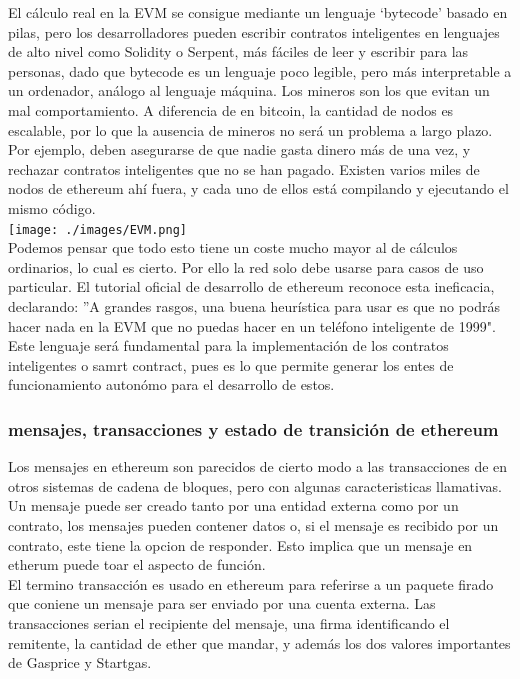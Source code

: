 \documentclass[11pt,a4paper]{article}
\begin{document}
El cálculo real en la EVM se consigue mediante un lenguaje ‘bytecode’ basado en pilas, pero los desarrolladores pueden escribir contratos inteligentes en lenguajes de alto nivel como Solidity o Serpent, más fáciles de leer y escribir para las personas, dado que bytecode es un lenguaje poco legible, pero más interpretable a un ordenador, análogo al lenguaje máquina. Los mineros son los que evitan un mal comportamiento. A diferencia de en bitcoin, la cantidad de nodos es escalable, por lo que la ausencia de mineros no será un problema a largo plazo. Por ejemplo, deben asegurarse de que
nadie gasta dinero más de una vez, y rechazar contratos inteligentes que no se han pagado. Existen varios miles de nodos de ethereum ahí fuera, y cada uno de ellos está compilando y ejecutando el mismo código.\\


\texttt{[image: ./images/EVM.png]}\\

Podemos pensar que todo esto tiene un coste mucho mayor al de cálculos ordinarios, lo cual es cierto. Por ello la red solo debe usarse para casos de uso particular. El tutorial oficial de desarrollo de ethereum reconoce esta ineficacia, declarando:
''A grandes rasgos, una buena heurística para usar es que no podrás hacer nada en la EVM que no puedas hacer en un teléfono inteligente de 1999".\\

Este lenguaje será fundamental para la implementación de los contratos inteligentes o samrt contract, pues es lo que permite generar los entes de funcionamiento autonómo para el desarrollo de estos.

\subsubsection{mensajes, transacciones y estado de transición de ethereum}

Los mensajes en ethereum son parecidos de cierto modo a las transacciones de en otros  sistemas de cadena de bloques, pero  con algunas caracteristicas llamativas. Un mensaje puede ser creado tanto por una entidad externa como por un contrato, los mensajes pueden contener datos o, si el mensaje es recibido por un contrato, este tiene la opcion de responder. Esto implica que un mensaje en etherum puede toar el aspecto de función.\\

El termino transacción es usado en  ethereum para referirse a un paquete firado que coniene un mensaje para ser enviado por una cuenta externa. Las transacciones serian el recipiente del mensaje, una firma identificando el remitente, la cantidad de ether que mandar, y además los dos valores importantes de Gasprice y Startgas.\\
\end{document}
